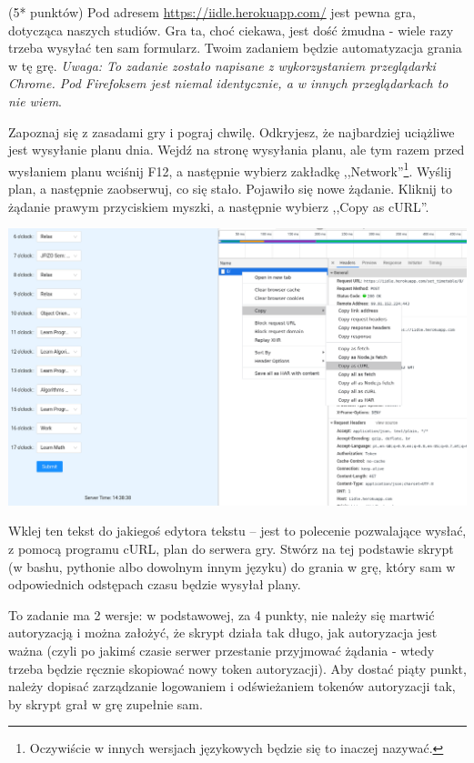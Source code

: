 \begin{zadanie} (5* punktów)
Pod adresem \url{https://iidle.herokuapp.com/} jest pewna gra, dotycząca naszych studiów. Gra ta, choć ciekawa, jest dość żmudna - wiele razy trzeba wysyłać ten sam formularz. Twoim zadaniem będzie automatyzacja grania w tę grę. \emph{Uwaga: To zadanie zostało napisane z wykorzystaniem przeglądarki Chrome. Pod Firefoksem jest niemal identycznie, a w innych przeglądarkach to nie wiem}.

Zapoznaj się z zasadami gry i pograj chwilę. Odkryjesz, że najbardziej uciążliwe jest wysyłanie planu dnia. Wejdź na stronę wysyłania planu, ale tym razem przed wysłaniem planu wciśnij F12, a następnie wybierz zakładkę ,,Network''\footnote{Oczywiście w innych wersjach językowych będzie się to inaczej nazywać.}. Wyślij plan, a następnie zaobserwuj, co się stało. Pojawiło się nowe żądanie. Kliknij to żądanie prawym przyciskiem myszki, a następnie wybierz ,,Copy as cURL''.  

\includegraphics[scale=1.3]{iidle.png}

Wklej ten tekst do jakiegoś edytora tekstu -- jest to polecenie pozwalające wysłać, z pomocą programu cURL, plan do serwera gry. Stwórz na tej podstawie skrypt (w bashu, pythonie albo dowolnym innym języku) do grania w grę, który sam w odpowiednich odstępach czasu będzie wysyłał plany. 

To zadanie ma 2 wersje: w podstawowej, za 4 punkty, nie należy się martwić autoryzacją i można założyć, że skrypt działa tak długo, jak autoryzacja jest ważna (czyli po jakimś czasie serwer przestanie przyjmować żądania - wtedy trzeba będzie ręcznie skopiować nowy token autoryzacji). Aby dostać piąty punkt, należy dopisać zarządzanie logowaniem i odświeżaniem tokenów autoryzacji tak, by skrypt grał w grę zupełnie sam.
\end{zadanie}




